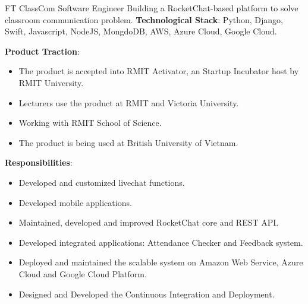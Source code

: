 \documentclass[12pt]{article} %
\begin{document}
\begin{paracol}{2}



{FT} %
{ClassCom} %
{Software Engineer} %
{Building a RocketChat-based platform to solve classroom communication problem.} %
{\textbf{Technological Stack}: Python, Django, Swift, Javascript, NodeJS, MongdoDB, AWS, Azure Cloud, Google Cloud.}
{\textbf{Product Traction}: 
	\begin{itemize}
	\setlength{\itemsep}{1pt}	
	  \item The product is accepted into RMIT Activator, an Startup Incubator host by RMIT University.
	  \item Lecturers use the product at RMIT and Victoria University.
	  \item Working with RMIT School of Science.
	  \item The product is being used at British University of Vietnam.  
	\end{itemize}
\textbf{Responsibilities}:
	\begin{itemize}
	\setlength{\itemsep}{1pt}	
	  \item Developed and customized livechat functions.
	  \item Developed mobile applications.
	  \item Maintained, developed and improved RocketChat core and REST API.
	  \item Developed integrated applications: Attendance Checker and Feedback system.
	  \item Deployed and maintained the scalable system on Amazon Web Service, Azure Cloud and Google Cloud Platform.
	  \item Designed and Developed the Continuous Integration and Deployment.
	\end{itemize}	
}


\end{paracol}
\end{document}
